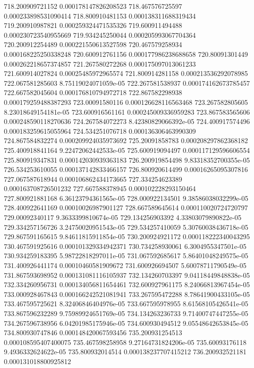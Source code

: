 {718.200909721152 0.000178147826208523
718.467576725597 0.000233898531090414
718.800910481153 0.000138311688319434
719.200910987821 0.000259324471535326
719.600911494488 0.000230723540955669
719.934245250044 0.000205993067704364
720.200912254489 0.000221550613527598
720.467579258934 0.000168225250338248
720.600912761156 0.000177986238688658
720.80091301449 0.000262218657374857
721.267580272268 0.000175097013061233
721.600914027824 0.00025485972965574
721.800914281158 0.000213536292078985
722.067581285603 8.75119024071059e-05
722.267581538937 0.000174162673785457
722.667582045604 0.000176810794972718
722.867582298938 0.000179259488387293
723.00091580116 0.000126628116563468
723.267582805605 8.23018649154181e-05
723.600916561161 0.000245009336959283
723.867583565606 0.000248590118270636
724.267584072273 8.42380829066392e-05
724.400917574496 0.000183259615055964
724.534251076718 0.000136306463990309
724.867584832274 0.000209924035973692
725.20091858783 0.000208297862368182
725.400918841164 9.22472062442533e-05
725.600919094497 0.000117129596606554
725.800919347831 0.000142030939363183
726.200919854498 9.83318352700355e-05
726.534253610055 0.000137142833466157
726.800920614499 0.00016265095307816
727.067587618944 0.000106862434173665
727.334254623389 0.000163708726501232
727.667588378945 0.000102228293150464
727.800921881168 6.36123794361565e-05
728.000922134501 9.38586038032299e-05
728.400922641169 0.00010026987901127
728.667589645614 0.000110020724720797
729.00092340117 9.3633399810674e-05
729.134256903392 4.33803079890822e-05
729.334257156726 3.24750020951543e-05
729.534257410059 5.30760038436718e-05
729.867591165615 9.84611815911854e-05
730.200924921172 0.000118222340043295
730.467591925616 0.000101329334942371
730.734258930061 6.3004955347501e-05
730.934259183395 5.98722818297011e-05
731.067592685617 5.86401048249575e-05
731.400926441174 0.00010460581909672
731.600926694507 5.60078711790549e-05
731.867593698952 0.000131081116105937
732.134260703397 9.04118449848838e-05
732.334260956731 0.000134056811654461
732.600927961175 8.24066813967454e-05
733.000928467843 0.000166242521081941
733.267595472288 8.78641900433105e-05
733.467595725621 8.32406846404976e-05
733.667595978955 8.61568105426541e-05
733.867596232289 9.75989924651769e-05
734.134263236733 9.71400747447255e-05
734.267596738956 6.04201985175946e-05
734.600930494512 9.05548642653845e-05
734.800930747846 0.000148420067593456
735.200931254513 0.000108595407400075
735.467598258958 9.27164731824206e-05
735.60093176118 9.4936332624622e-05
735.800932014514 0.000138237707415212
736.200932521181 0.000131018800925812
}
